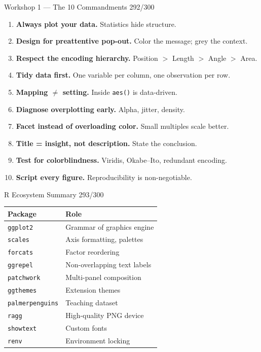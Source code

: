 \documentclass[10pt]{beamer}
\newcommand{\smark}[1]{\hfill{\scriptsize\color{codegray}#1}}
\begin{document}
\begin{frame}{Workshop 1 --- The 10 Commandments}
\smark{292/300}
\begin{enumerate}
    \item \textbf{Always plot your data.} Statistics hide structure.
    \item \textbf{Design for preattentive pop-out.} Color the message; grey the context.
    \item \textbf{Respect the encoding hierarchy.} Position $>$ Length $>$ Angle $>$ Area.
    \item \textbf{Tidy data first.} One variable per column, one observation per row.
    \item \textbf{Mapping $\neq$ setting.} Inside \texttt{aes()} is data-driven.
    \item \textbf{Diagnose overplotting early.} Alpha, jitter, density.
    \item \textbf{Facet instead of overloading color.} Small multiples scale better.
    \item \textbf{Title = insight, not description.} State the conclusion.
    \item \textbf{Test for colorblindness.} Viridis, Okabe--Ito, redundant encoding.
    \item \textbf{Script every figure.} Reproducibility is non-negotiable.
\end{enumerate}
\end{frame}

\begin{frame}{R Ecosystem Summary}
\smark{293/300}
\centering\small
\begin{tabular}{@{}ll@{}}
    \toprule
    \textbf{Package} & \textbf{Role} \\
    \midrule
    \texttt{ggplot2}          & Grammar of graphics engine \\
    \texttt{scales}           & Axis formatting, palettes \\
    \texttt{forcats}          & Factor reordering \\
    \texttt{ggrepel}          & Non-overlapping text labels \\
    \texttt{patchwork}        & Multi-panel composition \\
    \texttt{ggthemes}         & Extension themes \\
    \texttt{palmerpenguins}   & Teaching dataset \\
    \texttt{ragg}             & High-quality PNG device \\
    \texttt{showtext}         & Custom fonts \\
    \texttt{renv}             & Environment locking \\
    \bottomrule
\end{tabular}
\end{frame}
\end{document}

